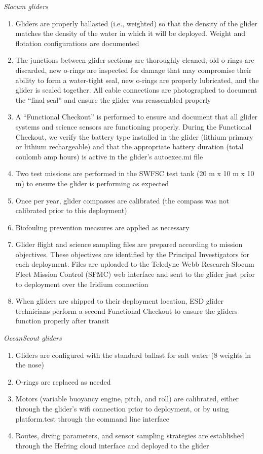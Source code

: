 \documentclass[
  letterpaper,
  DIV=11,
  numbers=noendperiod]{scrartcl}
\providecommand{\tightlist}{%
  \setlength{\itemsep}{0pt}\setlength{\parskip}{0pt}}
\begin{document}
\emph{Slocum gliders}

\begin{enumerate}
\def\labelenumi{\arabic{enumi}.}
\tightlist
\item
  Gliders are properly ballasted (i.e., weighted) so that the density of
  the glider matches the density of the water in which it will be
  deployed. Weight and flotation configurations are documented
\item
  The junctions between glider sections are thoroughly cleaned, old
  o-rings are discarded, new o-rings are inspected for damage that may
  compromise their ability to form a water-tight seal, new o-rings are
  properly lubricated, and the glider is sealed together. All cable
  connections are photographed to document the ``final seal'' and ensure
  the glider was reassembled properly
\item
  A ``Functional Checkout'' is performed to ensure and document that all
  glider systems and science sensors are functioning properly. During
  the Functional Checkout, we verify the battery type installed in the
  glider (lithium primary or lithium rechargeable) and that the
  appropriate battery duration (total coulomb amp hours) is active in
  the glider's autoexec.mi file
\item
  Two test missions are performed in the SWFSC test tank (20 m x 10 m x
  10 m) to ensure the glider is performing as expected
\item
  Once per year, glider compasses are calibrated (the compass was not
  calibrated prior to this deployment)
\item
  Biofouling prevention measures are applied as necessary
\item
  Glider flight and science sampling files are prepared according to
  mission objectives. These objectives are identified by the Principal
  Investigators for each deployment. Files are uploaded to the Teledyne
  Webb Research Slocum Fleet Mission Control (SFMC) web interface and
  sent to the glider just prior to deployment over the Iridium
  connection
\item
  When gliders are shipped to their deployment location, ESD glider
  technicians perform a second Functional Checkout to ensure the gliders
  function properly after transit
\end{enumerate}

\emph{OceanScout gliders}

\begin{enumerate}
\def\labelenumi{\arabic{enumi}.}
\tightlist
\item
  Gliders are configured with the standard ballast for salt water (8
  weights in the nose)
\item
  O-rings are replaced as needed
\item
  Motors (variable buoyancy engine, pitch, and roll) are calibrated,
  either through the glider's wifi connection prior to deployment, or by
  using platform.test through the command line interface
\item
  Routes, diving parameters, and sensor sampling strategies are
  established through the Hefring cloud interface and deployed to the
  glider
\end{enumerate}
\end{document}
